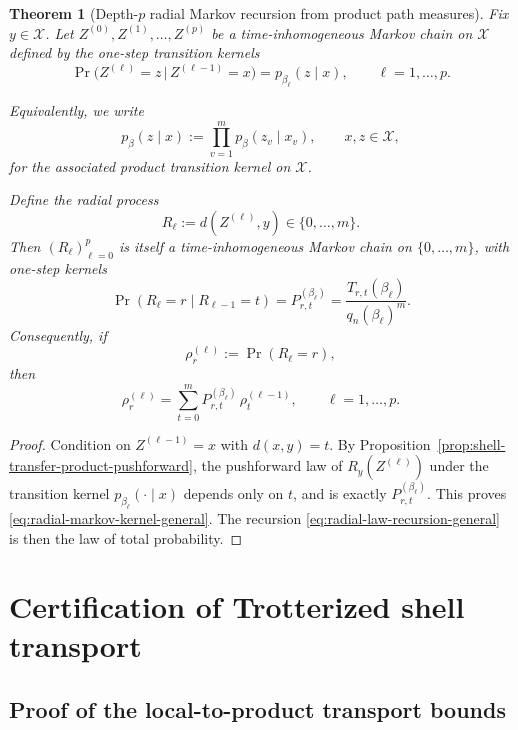 \documentclass[a4paper,onecolumn,11pt,unpublished]{quantumarticle}
\newtheorem{theorem}{Theorem}
\theoremstyle{remark}
\begin{document}
\begin{theorem}[Depth-\(p\) radial Markov recursion from product path measures]
\label{thm:depth-p-radial-markov}
Fix \(y\in \mathcal X\). Let \(Z^{(0)},Z^{(1)},\dots,Z^{(p)}\) be a time-inhomogeneous
Markov chain on \(\mathcal X\) defined by the one-step transition kernels
\[
\Pr\!\bigl(Z^{(\ell)}=z \,\big|\, Z^{(\ell-1)}=x\bigr)
=
p_{\beta_\ell}(z\mid x),
\qquad \ell=1,\dots,p.
\]

Equivalently, we write
\[
p_\beta(z\mid x)
:=
\prod_{v=1}^{m}p_\beta(z_v\mid x_v),
\qquad x,z\in \mathcal X,
\]
for the associated product transition kernel on \(\mathcal X\).

Define the radial process
\[
R_\ell:=d(Z^{(\ell)},y)\in\{0,\dots,m\}.
\]
Then \((R_\ell)_{\ell=0}^{p}\) is itself a time-inhomogeneous Markov chain on
\(\{0,\dots,m\}\), with one-step kernels
\begin{equation}
\label{eq:radial-markov-kernel-general}
\Pr(R_\ell=r\mid R_{\ell-1}=t)
=
P_{r,t}^{(\beta_\ell)}
=
\frac{T_{r,t}(\beta_\ell)}{q_n(\beta_\ell)^m}.
\end{equation}
Consequently, if
\[
\rho_r^{(\ell)}:=\Pr(R_\ell=r),
\]
then
\begin{equation}
\label{eq:radial-law-recursion-general}
\rho_r^{(\ell)}
=
\sum_{t=0}^{m}
P_{r,t}^{(\beta_\ell)}\,\rho_t^{(\ell-1)},
\qquad \ell=1,\dots,p.
\end{equation}
\end{theorem}

\begin{proof}
Condition on \(Z^{(\ell-1)}=x\) with \(d(x,y)=t\). By
Proposition~\ref{prop:shell-transfer-product-pushforward}, the pushforward law
of \(R_y(Z^{(\ell)})\) under the transition kernel
\(p_{\beta_\ell}(\cdot\mid x)\) depends only on \(t\), and is exactly
\(P_{r,t}^{(\beta_\ell)}\). This proves
\eqref{eq:radial-markov-kernel-general}. The recursion
\eqref{eq:radial-law-recursion-general} is then the law of total probability.
\end{proof}


\section{Certification of Trotterized shell transport} \label{app:trotter-transport-certification} 

\subsection{Proof of the local-to-product transport bounds} 
\end{document}
